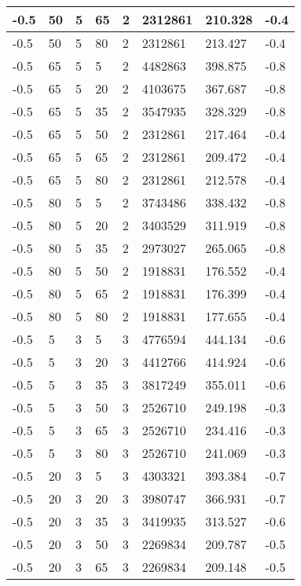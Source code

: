 \begin{longtable}{|p{1.4cm}|p{1.4cm}|p{1.4cm}|p{1.4cm}|p{1.4cm}|p{1.4cm}|p{1.4cm}|p{1.5cm}|}
        -0.5 & 50 & 5 & 65 & 2 & 2312861 & 210.328 & -0.4 \\ \hline
        -0.5 & 50 & 5 & 80 & 2 & 2312861 & 213.427 & -0.4 \\ \hline
        -0.5 & 65 & 5 & 5 & 2 & 4482863 & 398.875 & -0.8 \\ \hline
        -0.5 & 65 & 5 & 20 & 2 & 4103675 & 367.687 & -0.8 \\ \hline
        -0.5 & 65 & 5 & 35 & 2 & 3547935 & 328.329 & -0.8 \\ \hline
        -0.5 & 65 & 5 & 50 & 2 & 2312861 & 217.464 & -0.4 \\ \hline
        -0.5 & 65 & 5 & 65 & 2 & 2312861 & 209.472 & -0.4 \\ \hline
        -0.5 & 65 & 5 & 80 & 2 & 2312861 & 212.578 & -0.4 \\ \hline
        -0.5 & 80 & 5 & 5 & 2 & 3743486 & 338.432 & -0.8 \\ \hline
        -0.5 & 80 & 5 & 20 & 2 & 3403529 & 311.919 & -0.8 \\ \hline
        -0.5 & 80 & 5 & 35 & 2 & 2973027 & 265.065 & -0.8 \\ \hline
        -0.5 & 80 & 5 & 50 & 2 & 1918831 & 176.552 & -0.4 \\ \hline
        -0.5 & 80 & 5 & 65 & 2 & 1918831 & 176.399 & -0.4 \\ \hline
        -0.5 & 80 & 5 & 80 & 2 & 1918831 & 177.655 & -0.4 \\ \hline
        -0.5 & 5 & 3 & 5 & 3 & 4776594 & 444.134 & -0.6 \\ \hline
        -0.5 & 5 & 3 & 20 & 3 & 4412766 & 414.924 & -0.6 \\ \hline
        -0.5 & 5 & 3 & 35 & 3 & 3817249 & 355.011 & -0.6 \\ \hline
        -0.5 & 5 & 3 & 50 & 3 & 2526710 & 249.198 & -0.3 \\ \hline
        -0.5 & 5 & 3 & 65 & 3 & 2526710 & 234.416 & -0.3 \\ \hline
        -0.5 & 5 & 3 & 80 & 3 & 2526710 & 241.069 & -0.3 \\ \hline
        -0.5 & 20 & 3 & 5 & 3 & 4303321 & 393.384 & -0.7 \\ \hline
        -0.5 & 20 & 3 & 20 & 3 & 3980747 & 366.931 & -0.7 \\ \hline
        -0.5 & 20 & 3 & 35 & 3 & 3419935 & 313.527 & -0.6 \\ \hline
        -0.5 & 20 & 3 & 50 & 3 & 2269834 & 209.787 & -0.5 \\ \hline
        -0.5 & 20 & 3 & 65 & 3 & 2269834 & 209.148 & -0.5 \\ \hline

\end{longtable}
